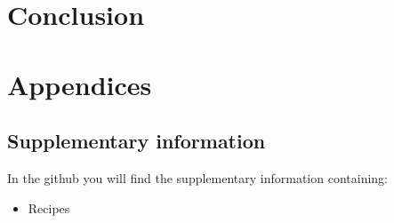 \documentclass[paper = a4, 12pt, oneside]{scrbook}
\begin{document}
        \part{Conclusion}\label{part:VII}
            
            
        \part{Appendices}\label{part:IIX}
            \chapter{Supplementary information}
                In the github you will find the supplementary information containing: 
                \begin{itemize}
                    \item Recipes
                \end{itemize}
    \medskip
    \printbibliography[heading=bibintoc, title={Bibliography}] 
    \clearpage    
\end{document}
